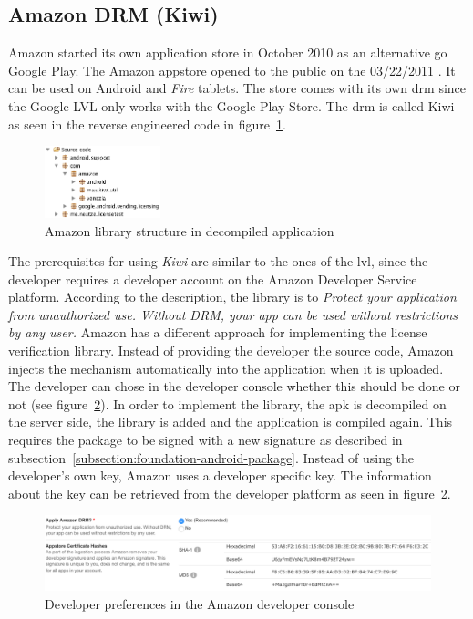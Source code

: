 \subsection{Amazon DRM (Kiwi)} \label{section:license-amazon}
Amazon started its own application store in October 2010 \cite{amazonBeta} as an alternative go Google Play.
The Amazon appstore opened to the public on the 03/22/2011 \cite{amazonRelease}.
It can be used on Android and \textit{Fire} tablets.
The store comes with its own \gls{drm} since the Google LVL only works with the Google Play Store.
The \gls{drm} is called Kiwi as seen in the reverse engineered code in figure~\ref{fig:amazonFolder}.
\newline
\begin{figure}[h]
    \centering
    \includegraphics[width=0.3\textwidth]{data/amazonFolder.png}
    \caption{Amazon library structure in decompiled application}
    \label{fig:amazonFolder}
\end{figure}
The prerequisites for using \textit{Kiwi} are similar to the ones of the \gls{lvl}, since the developer requires a developer account on the Amazon Developer Service platform.
According to the description, the library is to \textit{Protect your application from unauthorized use. Without DRM, your app can be used without restrictions by any user.} \cite{amazonDeveloper}
\newline
Amazon has a different approach for implementing the license verification library.
Instead of providing the developer the source code, Amazon injects the mechanism automatically into the application when it is uploaded.
The developer can chose in the developer console whether this should be done or not (see figure~\ref{fig:amazon}).
In order to implement the library, the \gls{apk} is decompiled on the server side, the library is added and the application is compiled again.
This requires the package to be signed with a new signature as described in subsection~\ref{subsection:foundation-android-package}.
Instead of using the developer's own key, Amazon uses a developer specific key.
The information about the key can be retrieved from the developer platform as seen in figure~\ref{fig:amazon}. \cite{amazonDeveloper}
\newline
\begin{figure}[h]
    \centering
    \includegraphics[width=1\textwidth]{data/amazon.png}
    \caption{Developer preferences in the Amazon developer console \cite{amazonDeveloper}}
    \label{fig:amazon}
\end{figure}
